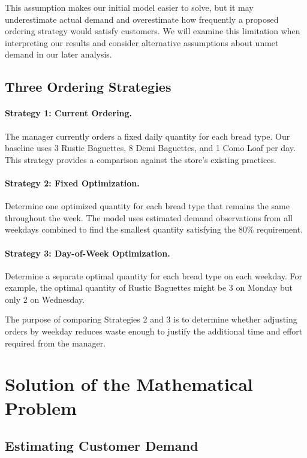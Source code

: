 \documentclass[11pt]{article}
\begin{document}
This assumption makes our initial model easier to solve, but it may underestimate actual demand and overestimate how frequently a proposed ordering strategy would satisfy customers. We will examine this limitation when interpreting our results and consider alternative assumptions about unmet demand in our later analysis.

\subsection{Three Ordering Strategies}

\paragraph{Strategy 1: Current Ordering.}
The manager currently orders a fixed daily quantity for each bread type. Our baseline uses 3 Rustic Baguettes, 8 Demi Baguettes, and 1 Como Loaf per day. This strategy provides a comparison against the store's existing practices.

\paragraph{Strategy 2: Fixed Optimization.}
Determine one optimized quantity for each bread type that remains the same throughout the week. The model uses estimated demand observations from all weekdays combined to find the smallest quantity satisfying the 80\% requirement.

\paragraph{Strategy 3: Day-of-Week Optimization.}
Determine a separate optimal quantity for each bread type on each weekday. For example, the optimal quantity of Rustic Baguettes might be 3 on Monday but only 2 on Wednesday.

The purpose of comparing Strategies 2 and 3 is to determine whether adjusting orders by weekday reduces waste enough to justify the additional time and effort required from the manager.

\section{Solution of the Mathematical Problem}

\subsection{Estimating Customer Demand}
\end{document}
